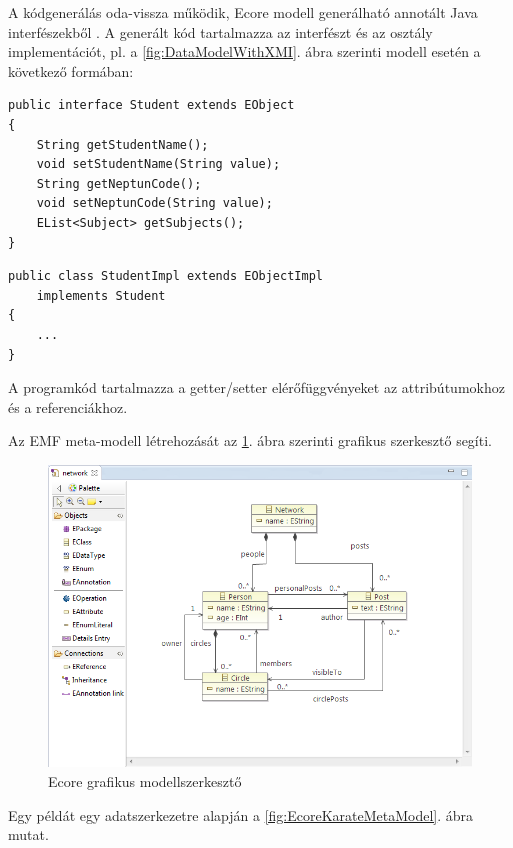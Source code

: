 A kódgenerálás oda-vissza működik, Ecore modell generálható annotált Java interfészekből \cite{MasteringEMF}. A generált kód tartalmazza az interfészt és az osztály implementációt, pl. a \ref{fig:DataModelWithXMI}. ábra szerinti modell esetén a következő formában:

\begin{lstlisting}
public interface Student extends EObject
{
    String getStudentName();
    void setStudentName(String value);
    String getNeptunCode();
    void setNeptunCode(String value);
    EList<Subject> getSubjects();
}
\end{lstlisting}
\begin{lstlisting}
public class StudentImpl extends EObjectImpl
    implements Student
{
    ...
}
\end{lstlisting}
A programkód tartalmazza a getter/setter elérőfüggvényeket az attribútumokhoz és a referenciákhoz.

Az EMF meta-modell létrehozását az \ref{fig:EcoreDiagramEditor}. ábra szerinti grafikus szerkesztő segíti.

\begin{figure}[h]
\centering
\includegraphics[width=\textwidth]{figures/ecore-diag-editor.png}
\caption{Ecore grafikus modellszerkesztő}
\label{fig:EcoreDiagramEditor}
\end{figure}

Egy példát egy adatszerkezetre \cite{VogelEMF} alapján a \ref{fig:EcoreKarateMetaModel}. ábra mutat.

